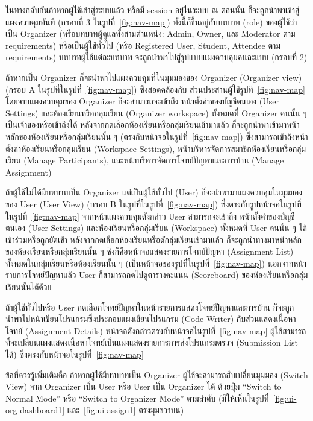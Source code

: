 \documentclass[12pt,one side,openright,a4paper]{cpe-thesis-th}
\newcommand{\thaijustify}[1]{%
  \par\hspace{30pt}\justifying
  #1
}
\begin{document}
        \thaijustify{
            ในทางกลับกันถ้าหากผู้ใช้เข้าสู่ระบบแล้ว หรือมี session อยู่ในระบบ ณ ตอนนั้น ก็จะถูกนำพาเข้าสู่แผงควบคุมทันที (กรอบที่ 3 ในรูปที่~\ref{fig:nav-map}) ทั้งนี้ก็ขึ้นอยู่กับบทบาท (role) ของผู้ใช้ว่าเป็น Organizer (หรือบทบาทผู้ดูแลทั้งสามตำแหน่ง: Admin, Owner, และ Moderator ตาม requirements) หรือเป็นผู้ใช้ทั่วไป (หรือ Registered User, Student, Attendee ตาม requirements) บทบาทผู้ใช้แต่ละบทบาท จะถูกนำพาไปสู่รูปแบบแผงควบคุมคนละแบบ (กรอบที่ 2)  
        }
        \thaijustify{
            ถ้าหากเป็น Organizer ก็จะนำพาไปแผงควบคุมที่ในมุมมองของ Organizer (Organizer view) (กรอบ A ในรูปที่ในรูปที่~\ref{fig:nav-map}) ซึ่งสอดคล้องกับ ส่วนประสานผู้ใช้รูปที่~\ref{fig:nav-map} โดยจากแผงควบคุมของ Organizer ก็จะสามารถจะเข้าถึง หน้าตั้งค่าของบัญชีตนเอง (User Settings) และห้องเรียนหรือกลุ่มเรียน (Organizer workspace) ทั้งหมดที่ Organizer คนนั้น ๆ เป็นเจ้าของหรือเข้าถึงได้ หลังจากกดเลือกห้องเรียนหรือกลุ่มเรียนเข้ามาแล้ว ก็จะถูกนำพาเข้ามาหน้าหลักของห้องเรียนหรือกลุ่มเรียนนั้น ๆ (ตรงกับหน้าจอในรูปที่~\ref{fig:nav-map}) ซึ่งสามารถเข้าถึงหน้าตั้งค่าห้องเรียนหรือกลุ่มเรียน (Workspace Settings), หน้าบริหารจัดการสมาชิกห้องเรียนหรือกลุ่มเรียน (Manage Participants), และหน้าบริหารจัดการโจทย์ปัญหาและการบ้าน (Manage Assignment) 
        }
        \thaijustify{
            ถ้าผู้ใช้ไม่ได้มีบทบาทเป็น Organizer แต่เป็นผู้ใช้ทั่วไป (User) ก็จะนำพามาแผงควบคุมในมุมมองของ User (User View) (กรอบ B ในรูปที่ในรูปที่~\ref{fig:nav-map}) ซึ่งตรงกับรูปหน้าจอในรูปที่ในรูปที่~\ref{fig:nav-map} จากหน้าแผงควบคุมดังกล่าว User สามารถจะเข้าถึง หน้าตั้งค่าของบัญชีตนเอง (User Settings) และห้องเรียนหรือกลุ่มเรียน (Workspace) ทั้งหมดที่ User คนนั้น ๆ ได้เข้าร่วมหรือถูกยัดเข้า หลังจากกดเลือกห้องเรียนหรือดักลุ่มเรียนเข้ามาแล้ว ก็จะถูกนำทางมาหน้าหลักของห้องเรียนหรือกลุ่มเรียนนั้น ๆ ซึ่งก็คือหน้าจอแสดงรายการโจทย์ปัญหา (Assignment List) ทั้งหมดในกลุ่มเรียนหรือห้องเรียนนั้น ๆ (เป็นหน้าจอของรูปที่ในรูปที่~\ref{fig:nav-map}) นอกจากหน้ารายการโจทย์ปัญหาแล้ว User ก็สามารถกดไปดูตารางคะแนน (Scoreboard) ของห้องเรียนหรือกลุ่มเรียนนั้นได้ด้วย 
        }
        \thaijustify{
            ถ้าผู้ใช้ทั่วไปหรือ User กดเลือกโจทย์ปัญหาในหน้ารายการแสดงโจทย์ปัญหาและการบ้าน ก็จะถูกนำพาไปหน้าเขียนโปรแกรมซึ่งประกอบแผงเขียนโปรแกรม (Code Writer) กับส่วนแสดงเนื้อหาโจทย์ (Assignment Details) หน้าจอดังกล่าวตรงกับหน้าจอในรูปที่~\ref{fig:nav-map} ผู้ใช้สามารถที่จะเปลี่ยนแผงแสดงเนื้อหาโจทย์เป็นแผงแสดงรายการการส่งโปรแกรมตรวจ (Submission List ได้) ซึ่งตรงกับหน้าจอในรูปที่~\ref{fig:nav-map}
        }
        \thaijustify{
            ข้อที่ควรรู้เพิ่มเติมคือ ถ้าหากผู้ใช้มีบทบาทเป็น Organizer ผู้ใช้จะสามารถสับเปลี่ยนมุมมอง (Switch View) จาก Organizer เป็น User หรือ User เป็น Organizer ได้ ด้วยปุ่ม “Switch to Normal Mode” หรือ “Switch to Organizer Mode” ตามลำดับ (มีให้เห็นในรูปที่~\ref{fig:ui-org-dashboard1} และ~\ref{fig:ui-assign1} ตรงมุมขวาบน)
        }
    \pagebreak
\pagebreak
\end{document}
